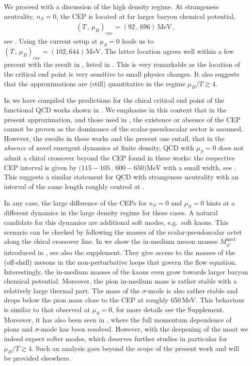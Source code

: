 \documentclass[reprint,twocolumn,superscriptaddress,preprintnumbers,amsmath,amssymb,aps,prd,floatfix]{revtex4-2}
\begin{document}
%
We proceed with a discussion of the high density regime. At strangeness neutrality, $n_S=0$, the CEP is located at far larger baryon chemical potential, 
%
\begin{align}
	(T\,,\,{\mu_{B}})_{_\text{CEP}}=(92\,,\,696)\, \text{MeV}\,, 
	\label{eq:CEPns=0} 
\end{align}
%
see . Using the current setup at $\mu_S=0$ leads us to    $(T\,,\,{\mu_{B}})_{_\text{CEP}}=(102,644)\, \text{MeV}$. The latter location agrees well within a few percent with the result in \cite{Fu:2019hdw}, listed in . This is very remarkable as the location of the critical end point is very sensitive to small physics changes. It also suggests that the approximations are (still) quantitative in the regime $\mu_B/T\gtrsim 4$. 

In  we have  compiled the predictions for the chiral critical end point of the functional QCD works shown in . We emphasise in this context that in the present approximation, and those used in \cite{Fu:2019hdw, Gao:2020fbl, Gunkel:2021oya}, the existence or absence of the CEP cannot be proven as the dominance of the scalar-pseudoscalar sector is assumed. However, the results in these works and the present one entail, that in the \textit{absence} of novel emergent dynamics at finite density, QCD with $\mu_S=0$ does not admit a chiral crossover beyond the CEP found in these works: the respective CEP interval is given by $\bigl(115-105\,,\, 600-650\bigr)\textrm{MeV}$ with a small width, see \cite{Fischer:2026uni}. This suggests a similar statement for QCD with strangeness neutrality with an interval of the same length roughly centred at 
. 

In any case, the large difference of the CEPs for $n_S=0$ and $\mu_S=0$ hints at a different dynamics in the large density regime for these cases. A natural candidate for this dynamics are additional soft modes, e.g.~soft kaons. This scenario can be checked  by following the masses of the scalar-pseudoscalar octet along the chiral crossover line. In   we show the in-medium meson masses $M^\textrm{med}_{\phi^i}$  introduced in \cite{Fu:2019hdw}, see also the supplement. They give access to the masses of the (off-shell) mesons in the non-perturbative loops that govern the flow equation. Interestingly, the in-medium masses of the kaons even grow towards larger baryon chemical potential. Moreover, the pion in-medium mass is rather stable with a relatively large thermal part. The mass of the $\sigma$-mode is also rather stable and drops below the pion mass close to the CEP at roughly 650\,MeV. This behaviour is similar to that observed at $\mu_S=0$, for more details see the Supplement. Moreover, it has also been seen in \cite{Pawlowski:2025jpg}, where the full momentum dependence of pions and $\sigma$-mode has been resolved. However, with the deepening of the moat we indeed expect softer modes, which deserves further studies in particular for $\mu_B/T\gtrsim 4$. Such an analysis goes beyond the scope of the present work and will be provided elsewhere. 
\end{document}
